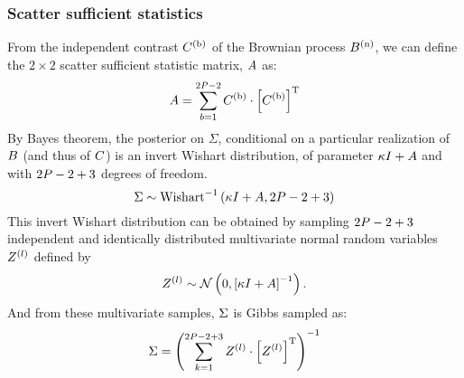 \subsubsection{Scatter sufficient statistics}
From the independent contrast $C^{(\text{b})}$ of the Brownian process $B^{(\text{n})}$, we can define the $2 \times 2$  scatter sufficient statistic matrix, $A$ as:
\begin{equation}
A = \sum_{b=1}^{2 P - 2} C^{(\text{b})} \cdot \left[C^{(\text{b})}\right]^{\mathrm{T}}
\end{equation}
By Bayes theorem, the posterior on $\Sigma$, conditional on a particular realization of $B$ (and thus of $C$) is an invert Wishart distribution, of parameter $\kappa I + A$ and with $2 P - 2 + 3$ degrees of freedom.
\begin{equation}
\Sigma  \sim \mathrm{Wishart}^{-1}\left( \kappa I + A, 2 P - 2 + 3\right)
\end{equation}
This invert Wishart distribution can be obtained by sampling $2 P - 2 + 3$ independent and identically distributed multivariate normal random variables $Z^{(l)}$ defined by
\begin{equation}
Z^{(l)} \sim \mathcal{N} \left( 0, \left[\kappa I + A\right]^{-1} \right).
\end{equation}
And from these multivariate samples, $\Sigma$ is Gibbs sampled as:
\begin{equation}
\Sigma = \left( \sum_{k=1}^{2 P - 2 + 3} Z^{(l)} \cdot \left[Z^{(l)} \right] ^{\mathrm{T}} \right)^{-1}
\end{equation}
